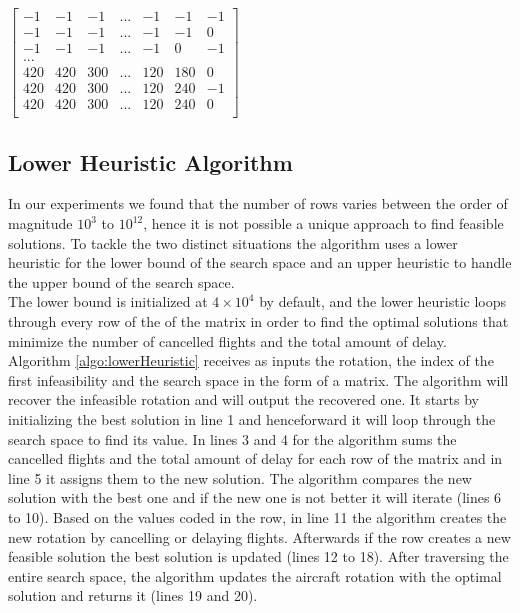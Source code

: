 $\begin{bmatrix}
	-1	&  -1	&  -1	& ...	&  -1 &	  -1 &	-1\\
	-1	&  -1	&  -1	& ...	&  -1 &	  -1 &	0\\
	-1	&  -1	&  -1	& ...	&  -1 &	   0 &	-1\\
	...	&		&		&       &     &      &      \\    	
	420	& 420	& 300	& ...	& 120 &	 180 &	0\\
	420	& 420	& 300	& ...	& 120 &	 240 &	-1\\
	420	& 420	& 300	& ...	& 120 &	 240 &	0\\
\end{bmatrix}$

\subsection{Lower Heuristic Algorithm} \label{sec:lowerHeuristic}

In our experiments we found that the number of rows varies between the order of magnitude $10^3$ to $10^{12}$, hence it is not possible a unique approach to find feasible solutions. To tackle the two distinct situations the algorithm uses a lower heuristic for the lower bound of the search space and an upper heuristic to handle the upper bound of the search space.\\
The lower bound is initialized at $4 \times 10^4$ by default, and the lower heuristic loops through every row of the of the matrix in order to find the optimal solutions that minimize the number of cancelled flights and the total amount of delay. Algorithm \ref{algo:lowerHeuristic} receives as inputs the rotation, the index of the first infeasibility and the search space in the form of a matrix. The algorithm will recover the infeasible rotation and will output the recovered one. It starts by initializing the best solution in line 1 and henceforward it will loop through the search space to find its value. In lines 3 and 4 for the algorithm sums the cancelled flights and the total amount of delay for each row of the matrix and in line 5 it assigns them to the new solution. The algorithm compares the new solution with the best one and if the new one is not better it will iterate (lines 6 to 10). Based on the values coded in the row, in line 11 the algorithm creates the new rotation by cancelling or delaying flights. Afterwards if the row creates a new feasible solution the best solution is updated (lines 12 to 18). After traversing the entire search space, the algorithm updates the aircraft rotation with the optimal solution and returns it (lines 19 and 20).\\

